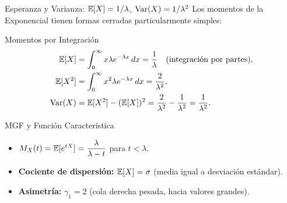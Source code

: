 \documentclass[10pt, aspectratio=169]{beamer}
\begin{document}
\begin{frame}{Esperanza y Varianza: $\mathbb{E}[X] = 1/\lambda$, $\operatorname{Var}(X) = 1/\lambda^{2}$}
  \footnotesize
  Los momentos de la Exponencial tienen formas cerradas particularmente simples: \pause

  \vspace{0.1cm}
  \begin{block}{Momentos por Integración}
    \begin{align*}
      \mathbb{E}[X] &= \int_{0}^{\infty} x \lambda e^{-\lambda x}\,dx = \frac{1}{\lambda} \quad \text{(integración por partes)}, \\
      \mathbb{E}[X^{2}] &= \int_{0}^{\infty} x^{2} \lambda e^{-\lambda x}\,dx = \frac{2}{\lambda^{2}}, \\
      \operatorname{Var}(X) &= \mathbb{E}[X^{2}] - (\mathbb{E}[X])^{2} = \frac{2}{\lambda^{2}} - \frac{1}{\lambda^{2}} = \frac{1}{\lambda^{2}}.
    \end{align*}
  \end{block}

  \vspace{0.1cm}
  \pause
  \begin{alertblock}{MGF y Función Característica}
    \begin{itemize}\itemsep=0.05cm
      \item $M_{X}(t) = \mathbb{E}[e^{tX}] = \dfrac{\lambda}{\lambda - t}$ para $t < \lambda$.
      \item \textbf{Cociente de dispersión:} $\mathbb{E}[X] = \sigma$ (media igual a desviación estándar).
      \item \textbf{Asimetría:} $\gamma_{1} = 2$ (cola derecha pesada, hacia valores grandes).
    \end{itemize}
  \end{alertblock}
\end{frame}
\end{document}
